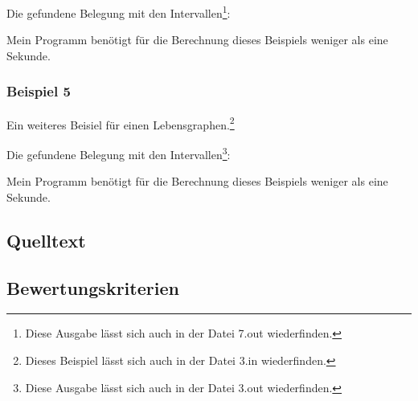 {\small

}

Die gefundene Belegung mit den Intervallen\footnote{Diese Ausgabe lässt sich auch in der Datei 7.out wiederfinden.}:

{\small

}

Mein Programm benötigt für die Berechnung dieses Beispiels weniger als eine Sekunde.

\subsubsection*{Beispiel 5}
Ein weiteres Beisiel für einen Lebensgraphen.\footnote{Dieses Beispiel lässt sich auch in der Datei 3.in wiederfinden.}

{\small

}

Die gefundene Belegung mit den Intervallen\footnote{Diese Ausgabe lässt sich auch in der Datei 3.out wiederfinden.}:

{\small

}

Mein Programm benötigt für die Berechnung dieses Beispiels weniger als eine Sekunde.


\subsection{Quelltext}

{\small

}

\subsection{Bewertungskriterien}

